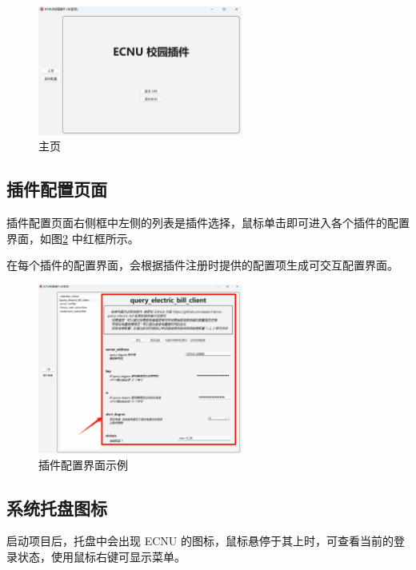 \documentclass[14pt,a4paper,UTF8,twoside]{article}
\begin{document}
\begin{figure}[H]
    \centering
    \includegraphics[width=0.6\textwidth]{img/home}
    \caption{主页}
    \label{fig:home}
\end{figure}

\subsection{插件配置页面}\label{subsubsec:gui-plugin-config}

插件配置页面右侧框中左侧的列表是插件选择，鼠标单击即可进入各个插件的配置界面，如图\ref{fig:plugin-config-gui} 中红框所示。

在每个插件的配置界面，会根据插件注册时提供的配置项生成可交互配置界面。

\begin{figure}[H]
    \centering
    \includegraphics[width=0.6\textwidth]{img/plugin_config_gui}
    \caption{插件配置界面示例}
    \label{fig:plugin-config-gui}
\end{figure}

\subsection{系统托盘图标}

启动项目后，托盘中会出现 ECNU 的图标，鼠标悬停于其上时，可查看当前的登录状态，使用鼠标右键可显示菜单。
\end{document}
